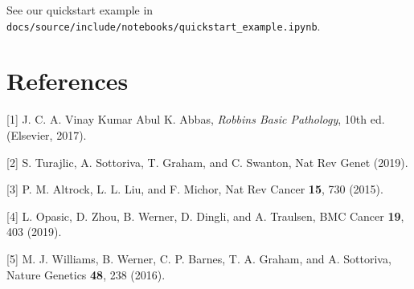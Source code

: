 \documentclass[]{article}
\begin{document}
See our quickstart example in
\texttt{docs/source/include/notebooks/quickstart\_example.ipynb}.

\hypertarget{bibliography}{%
\section*{References}\label{bibliography}}

\hypertarget{refs}{}
\leavevmode\hypertarget{ref-kumar:book:2017}{}%
{[}1{]} J. C. A. Vinay Kumar Abul K. Abbas, \emph{Robbins Basic
Pathology}, 10th ed. (Elsevier, 2017).

\leavevmode\hypertarget{ref-turajlic:NRG:2019}{}%
{[}2{]} S. Turajlic, A. Sottoriva, T. Graham, and C. Swanton, Nat Rev
Genet (2019).

\leavevmode\hypertarget{ref-altrock:NatRevCancer:2015}{}%
{[}3{]} P. M. Altrock, L. L. Liu, and F. Michor, Nat Rev Cancer
\textbf{15}, 730 (2015).

\leavevmode\hypertarget{ref-opasic:BMCCancer:2019}{}%
{[}4{]} L. Opasic, D. Zhou, B. Werner, D. Dingli, and A. Traulsen, BMC
Cancer \textbf{19}, 403 (2019).

\leavevmode\hypertarget{ref-williams:NG:2016}{}%
{[}5{]} M. J. Williams, B. Werner, C. P. Barnes, T. A. Graham, and A.
Sottoriva, Nature Genetics \textbf{48}, 238 (2016).
\end{document}
